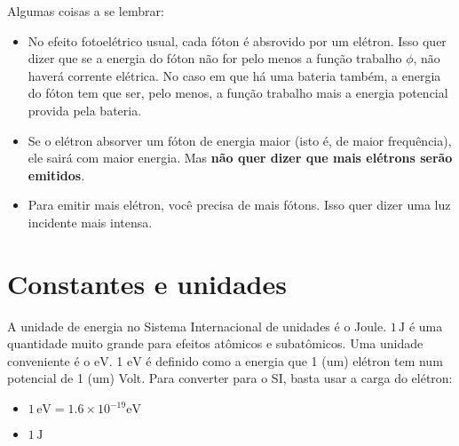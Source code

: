 \documentclass{article}
\begin{document}
Algumas coisas a se lembrar:
\begin{itemize}
\item No efeito fotoel\'etrico usual, cada f\'oton \'e absrovido por um el\'etron. Isso quer dizer que se a energia do f\'oton n\~ao for pelo menos a fun\c c\~ao trabalho $\phi$, n\~ao haver\'a corrente el\'etrica. No caso em que h\'a uma bateria tamb\'em, a energia do f\'oton tem que ser, pelo menos, a fun\c c\~ao trabalho mais a energia potencial provida pela bateria.
\item Se o el\'etron absorver um f\'oton de energia maior (isto \'e, de maior frequ\^encia), ele sair\'a com maior energia. Mas \textbf{n\~ao quer dizer que mais el\'etrons ser\~ao emitidos}.
\item Para emitir mais el\'etron, voc\^e precisa de mais f\'otons. Isso quer dizer uma luz incidente mais intensa.
\end{itemize}

\section{Constantes e unidades}

A unidade de energia no Sistema Internacional de unidades \'e o Joule. $1\,\text{J}$ \'e uma quantidade muito grande para efeitos at\^omicos e subat\^omicos. Uma unidade conveniente \'e o $\text{eV}$. 1 $\text{eV}$ \'e definido como a energia que 1 (um) el\'etron tem num potencial de 1 (um) Volt. Para converter para o SI, basta usar a carga do el\'etron:

\begin{itemize}
\item $1\,\text{eV} = 1.6\times 10^{-19}\text{eV}$
\item $1\,\text{J}$
\end{itemize}
\end{document}
